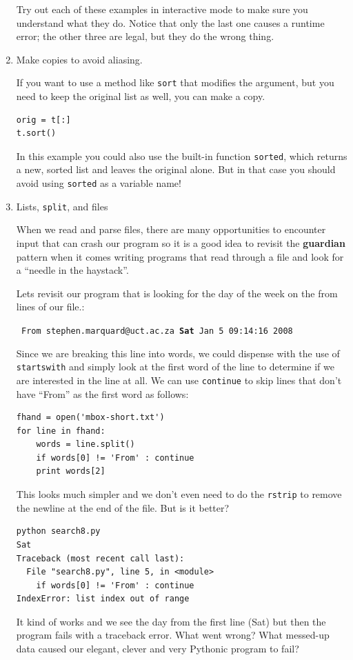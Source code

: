 \documentclass[10pt]{book}
\begin{document}
\begin{enumerate}
Try out each of these examples in interactive mode to make sure
you understand what they do.  Notice that only the last
one causes a runtime error; the other three are legal, but they
do the wrong thing.


\item Make copies to avoid aliasing.


If you want to use a method like {\tt sort} that modifies
the argument, but you need to keep the original list as
well, you can make a copy.

\beforeverb
\begin{verbatim}
orig = t[:]
t.sort()
\end{verbatim}
\afterverb

In this example you could also use the built-in function {\tt sorted},
which returns a new, sorted list and leaves the original alone.
But in that case you should avoid using {\tt sorted} as a variable
name!

\item Lists, {\tt split}, and files

When we read and parse files, there are many opportunities
to encounter input that can crash our program so it is a good 
idea to revisit the {\bf guardian} pattern when it comes
writing programs that read through a file 
and look for a ``needle in the haystack''.

Lets revisit our program that is looking for the day of the
week on the from lines of our file.:

{\tt
From stephen.marquard@uct.ac.za {\bf Sat} Jan  5 09:14:16 2008
}

Since we are breaking this line into words, we could dispense
with the use of {\tt startswith} and simply look at the 
first word of the line to determine if we are interested
in the line at all.  We can use {\tt continue} to skip lines
that don't have ``From'' as the first word as follows:

\beforeverb
\begin{verbatim}
fhand = open('mbox-short.txt')
for line in fhand:
    words = line.split()
    if words[0] != 'From' : continue
    print words[2]
\end{verbatim}
\afterverb
%
This looks much simpler and we don't even need to do the 
{\tt rstrip} to remove the newline at the end of the file.
But is it better?

\beforeverb
\begin{verbatim}
python search8.py 
Sat
Traceback (most recent call last):
  File "search8.py", line 5, in <module>
    if words[0] != 'From' : continue
IndexError: list index out of range
\end{verbatim}
\afterverb
%
It kind of works and we see the day from the first line
(Sat) but then the program fails with a traceback error.
What went wrong?  What messed-up data caused our elegant, 
clever and very Pythonic program to fail?


\end{enumerate}
\end{document}
